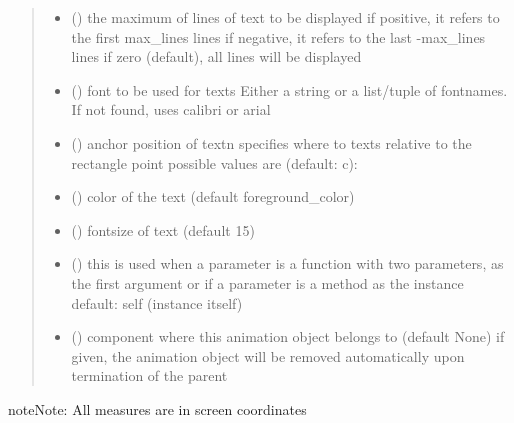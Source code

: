 \documentclass[letterpaper,10pt,english]{sphinxmanual}
\begin{document}
\begin{fulllineitems}
\begin{quote}
\begin{description}
\begin{itemize}
\item {} 
 () \textendash{} the maximum of lines of text to be displayed 
if positive, it refers to the first max\_lines lines 
if negative, it refers to the last -max\_lines lines 
if zero (default), all lines will be displayed

\item {} 
 () \textendash{} font to be used for texts 
Either a string or a list/tuple of fontnames.
If not found, uses calibri or arial

\item {} 
 () \textendash{} anchor position of text\textbar{}n\textbar{}
specifies where to texts relative to the rectangle
point 
possible values are (default: c): 

\item {} 
 () \textendash{} color of the text (default foreground\_color)

\item {} 
 () \textendash{} fontsize of text (default 15)

\item {} 
 () \textendash{} this is used when a parameter is a function with two parameters, as the first argument or
if a parameter is a method as the instance 
default: self (instance itself)

\item {} 
 ({\hyperref[\detokenize{Reference:salabim.Component}]{}}) \textendash{} component where this animation object belongs to (default None) 
if given, the animation object will be removed
automatically upon termination of the parent

\end{itemize}

\end{description}\end{quote}

\begin{sphinxadmonition}{note}{Note:}
All measures are in screen coordinates 


\end{sphinxadmonition}
\end{fulllineitems}
\end{document}
